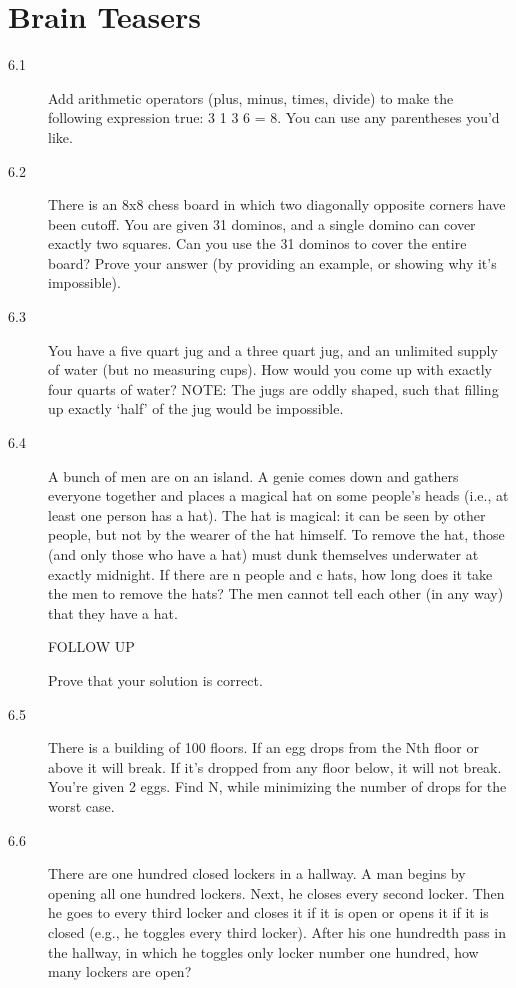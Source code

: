 \chapter{Brain Teasers}
\small{}

\begin{description}
\item[6.1] Add arithmetic operators (plus, minus, times, divide) to make the following expression true: 3 1 3 6 = 8. You can use any parentheses you’d like.
%

\item[6.2] There is an 8x8 chess board in which two diagonally opposite corners have been cutoff. You are given 31 dominos, and a single domino can cover exactly two squares. Can you use the 31 dominos to cover the entire board? Prove your answer (by providing an example, or showing why it’s impossible).
%

\item[6.3] You have a five quart jug and a three quart jug, and an unlimited supply of water (but no measuring cups). How would you come up with exactly four quarts of water? NOTE: The jugs are oddly shaped, such that filling up exactly ‘half’ of the jug would be impossible.
%

\item[6.4] A bunch of men are on an island. A genie comes down and gathers everyone together and places a magical hat on some people’s heads (i.e., at least one person has a hat). The hat is magical: it can be seen by other people, but not by the wearer of the hat himself. To remove the hat, those (and only those who have a hat) must dunk themselves underwater at exactly midnight. If there are n people and c hats, how long does it take the men to remove the hats? The men cannot tell each other (in any way) that they have a hat.

FOLLOW UP

Prove that your solution is correct.
%

\item[6.5] There is a building of 100 floors. If an egg drops from the Nth floor or above it will break. If it’s dropped from any floor below, it will not break. You’re given 2 eggs. Find N, while minimizing the number of drops for the worst case.
%

\item[6.6] There are one hundred closed lockers in a hallway. A man begins by opening all one hundred lockers. Next, he closes every second locker. Then he goes to every third locker and closes it if it is open or opens it if it is closed (e.g., he toggles every third locker). After his one hundredth pass in the hallway, in which he toggles only locker number one hundred, how many lockers are open?
%

\end{description}
